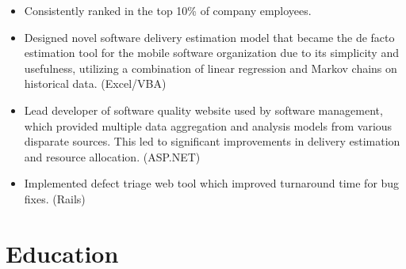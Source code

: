 \documentclass[11pt,a4paper,roman]{moderncv}
\begin{document}
\begin{itemize}
\item Consistently ranked in the top 10\% of company employees.
  \item Designed novel software delivery estimation model that became the de facto estimation tool for the mobile
        software organization due to its simplicity and usefulness, utilizing a combination of linear regression and
        Markov chains on historical data. (Excel/VBA)
  \item Lead developer of software quality website used by software management, which provided multiple data aggregation
        and analysis models from various disparate sources. This led to significant improvements in delivery estimation
        and resource allocation. (ASP.NET)
  \item Implemented defect triage web tool which improved turnaround time for bug fixes. (Rails)
\end{itemize}

\section{Education}
\end{document}
